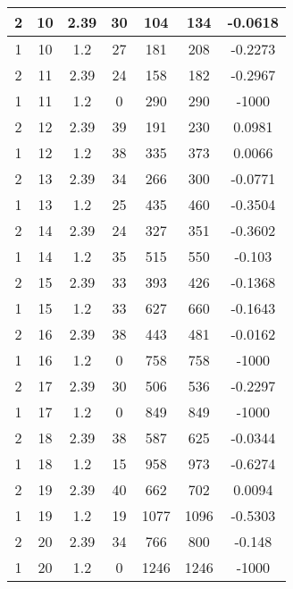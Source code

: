 \documentclass[letterpaper, 12pt]{article}
\begin{document}
\begin{longtable}{|c|c|c|c|c|c|c|}
\hline
2 & 10 & 2.39 & 30 & 104 & 134 & -0.0618 \\
\hline
1 & 10 & 1.2 & 27 & 181 & 208 & -0.2273 \\
\hline
2 & 11 & 2.39 & 24 & 158 & 182 & -0.2967 \\
\hline
1 & 11 & 1.2 & 0 & 290 & 290 & -1000 \\
\hline
2 & 12 & 2.39 & 39 & 191 & 230 & 0.0981 \\
\hline
1 & 12 & 1.2 & 38 & 335 & 373 & 0.0066 \\
\hline
2 & 13 & 2.39 & 34 & 266 & 300 & -0.0771 \\
\hline
1 & 13 & 1.2 & 25 & 435 & 460 & -0.3504 \\
\hline
2 & 14 & 2.39 & 24 & 327 & 351 & -0.3602 \\
\hline
1 & 14 & 1.2 & 35 & 515 & 550 & -0.103 \\
\hline
2 & 15 & 2.39 & 33 & 393 & 426 & -0.1368 \\
\hline
1 & 15 & 1.2 & 33 & 627 & 660 & -0.1643 \\
\hline
2 & 16 & 2.39 & 38 & 443 & 481 & -0.0162 \\
\hline
1 & 16 & 1.2 & 0 & 758 & 758 & -1000 \\
\hline
2 & 17 & 2.39 & 30 & 506 & 536 & -0.2297 \\
\hline
1 & 17 & 1.2 & 0 & 849 & 849 & -1000 \\
\hline
2 & 18 & 2.39 & 38 & 587 & 625 & -0.0344 \\
\hline
1 & 18 & 1.2 & 15 & 958 & 973 & -0.6274 \\
\hline
2 & 19 & 2.39 & 40 & 662 & 702 & 0.0094 \\
\hline
1 & 19 & 1.2 & 19 & 1077 & 1096 & -0.5303 \\
\hline
2 & 20 & 2.39 & 34 & 766 & 800 & -0.148 \\
\hline
1 & 20 & 1.2 & 0 & 1246 & 1246 & -1000 \\
\hline
\end{longtable}
\end{document}
